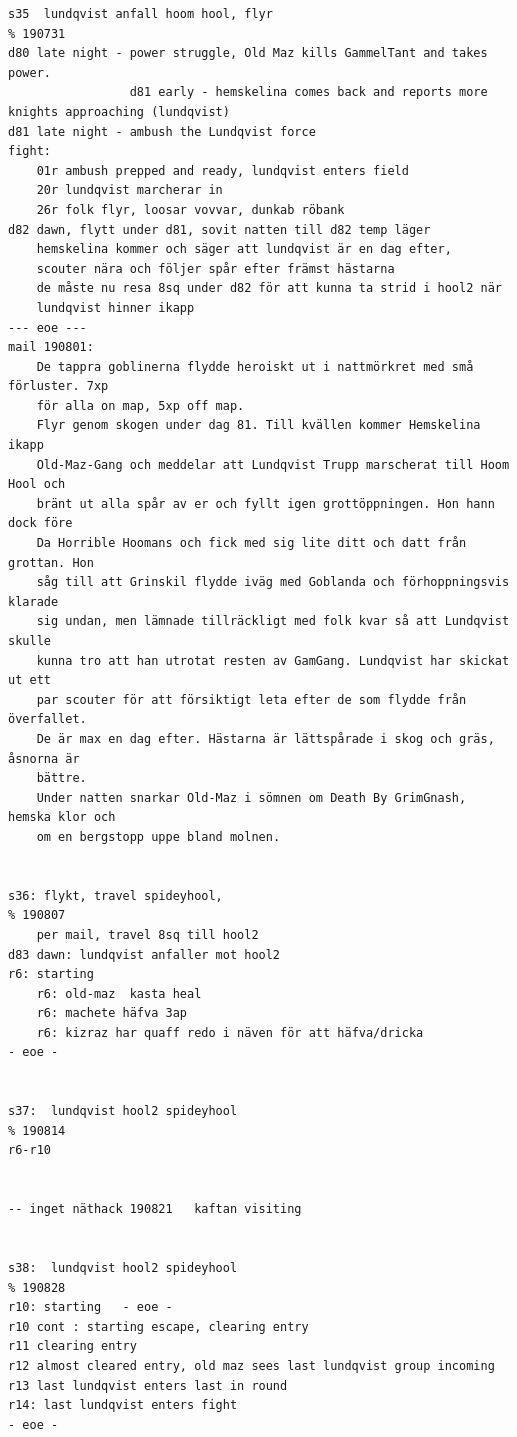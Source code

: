 \begin{verbatim}
s35  lundqvist anfall hoom hool, flyr                                   % 190731
d80 late night - power struggle, Old Maz kills GammelTant and takes power. 
                 d81 early - hemskelina comes back and reports more knights approaching (lundqvist)
d81 late night - ambush the Lundqvist force
fight:
    01r ambush prepped and ready, lundqvist enters field
    20r lundqvist marcherar in
    26r folk flyr, loosar vovvar, dunkab röbank
d82 dawn, flytt under d81, sovit natten till d82 temp läger
    hemskelina kommer och säger att lundqvist är en dag efter, 
    scouter nära och följer spår efter främst hästarna
    de måste nu resa 8sq under d82 för att kunna ta strid i hool2 när 
    lundqvist hinner ikapp
--- eoe ---
mail 190801:
    De tappra goblinerna flydde heroiskt ut i nattmörkret med små förluster. 7xp
    för alla on map, 5xp off map.
    Flyr genom skogen under dag 81. Till kvällen kommer Hemskelina ikapp
    Old-Maz-Gang och meddelar att Lundqvist Trupp marscherat till Hoom Hool och
    bränt ut alla spår av er och fyllt igen grottöppningen. Hon hann dock före 
    Da Horrible Hoomans och fick med sig lite ditt och datt från grottan. Hon 
    såg till att Grinskil flydde iväg med Goblanda och förhoppningsvis klarade 
    sig undan, men lämnade tillräckligt med folk kvar så att Lundqvist skulle
    kunna tro att han utrotat resten av GamGang. Lundqvist har skickat ut ett 
    par scouter för att försiktigt leta efter de som flydde från överfallet. 
    De är max en dag efter. Hästarna är lättspårade i skog och gräs, åsnorna är
    bättre.
    Under natten snarkar Old-Maz i sömnen om Death By GrimGnash, hemska klor och
    om en bergstopp uppe bland molnen.


s36: flykt, travel spideyhool,                                          % 190807
    per mail, travel 8sq till hool2
d83 dawn: lundqvist anfaller mot hool2
r6: starting
    r6: old-maz  kasta heal
    r6: machete häfva 3ap
    r6: kizraz har quaff redo i näven för att häfva/dricka
- eoe - 


s37:  lundqvist hool2 spideyhool                                        % 190814
r6-r10


-- inget näthack 190821   kaftan visiting


s38:  lundqvist hool2 spideyhool                                        % 190828
r10: starting   - eoe -
r10 cont : starting escape, clearing entry
r11 clearing entry
r12 almost cleared entry, old maz sees last lundqvist group incoming
r13 last lundqvist enters last in round
r14: last lundqvist enters fight   
- eoe -   



\end{verbatim}
